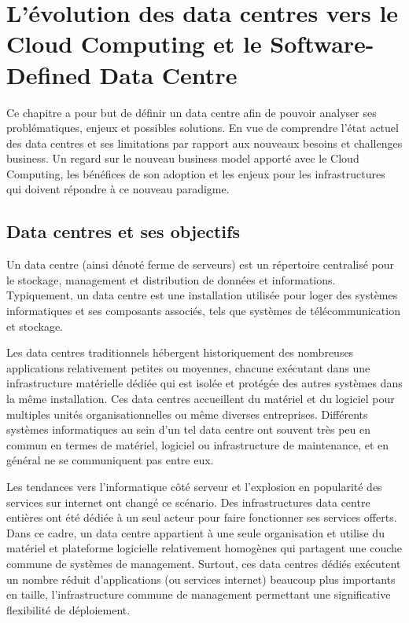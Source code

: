 
\chapter{L'évolution des data centres vers le Cloud Computing et le Software-Defined Data Centre}
\label{chap-1}

Ce chapitre a pour but de définir un data centre afin de pouvoir analyser ses problématiques, enjeux et possibles solutions. En vue de comprendre l'état actuel des data centres et ses limitations par rapport aux nouveaux besoins et challenges business. Un regard sur le nouveau business model apporté avec le Cloud Computing, les bénéfices de son adoption et les enjeux pour les infrastructures qui doivent répondre à ce nouveau paradigme.

\section{Data centres et ses objectifs}

Un data centre (ainsi dénoté ferme de serveurs) est un répertoire centralisé pour le stockage, management et distribution de données et informations. Typiquement, un data centre est une installation utilisée pour loger des systèmes informatiques et ses composants associés, tels que systèmes de télécommunication et stockage. \cite{understandingCloudWhatDC}

Les data centres traditionnels hébergent historiquement des nombreuses applications relativement petites ou moyennes, chacune exécutant dans une infrastructure matérielle dédiée qui est isolée et protégée des autres systèmes dans la même installation. Ces data centres accueillent du matériel et du logiciel pour multiples unités organisationnelles ou même diverses entreprises. Différents systèmes informatiques au sein d'un tel data centre ont souvent très peu en commun en termes de matériel, logiciel ou infrastructure de maintenance, et en général ne se communiquent pas entre eux. 


Les tendances vers l'informatique côté serveur et l'explosion en popularité des services sur internet ont changé ce scénario. Des infrastructures data centre entières ont été dédiée à un seul acteur pour faire fonctionner ses services offerts. Dans ce cadre, un data centre appartient à une seule organisation et utilise du matériel et plateforme logicielle relativement homogènes qui partagent une couche commune de systèmes de management. Surtout, ces data centres dédiés exécutent un nombre réduit d'applications (ou services internet) beaucoup plus importants en taille, l'infrastructure commune de management permettant une significative flexibilité de déploiement. 

